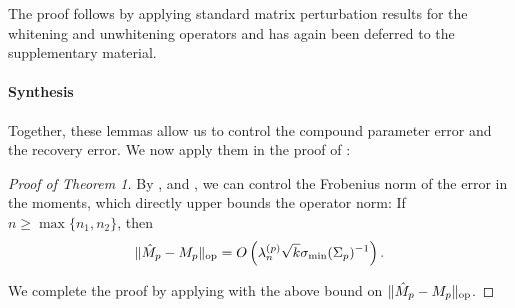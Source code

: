 The proof follows by applying standard matrix perturbation results for
the whitening and unwhitening operators and has again been deferred
to the supplementary material.

\paragraph{Synthesis}
Together, these lemmas allow us to control the compound parameter error
and the recovery error. We now apply them in the proof of
:

\begin{proof}[Proof of Theorem 1]
By ,  and , we
can control the Frobenius norm of the error in the moments, which
directly upper bounds the operator norm: If $n \ge \max\{n_1, n_2\}$,
then
\begin{align}
  \|\hat M_p - M_p\|_{\textrm{op}} = O\left( \lambda_n^{(p)} \sqrt{k} \sigma_\text{\rm min}(\Sigma_p)^{-1} \right).
\end{align}

We complete the proof by applying  with the above
bound on $\|\hat M_p - M_p\|_{\textrm{op}}$.

\end{proof}


